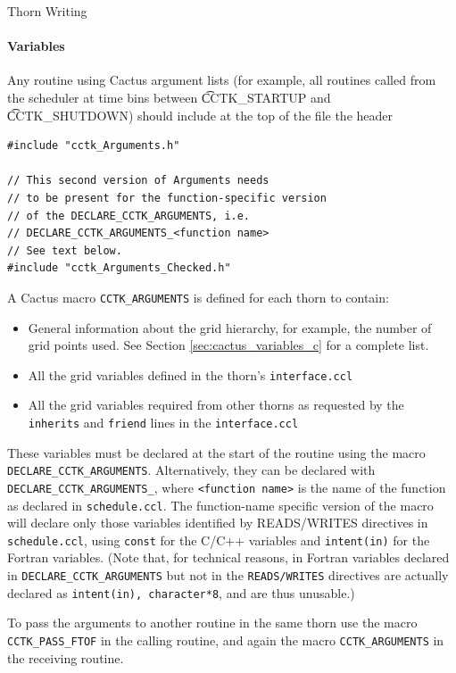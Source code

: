 \begin{cactuspart}{Thorn Writing}
\paragraph{Variables}

Any routine using Cactus argument lists (for example, all routines called from
the scheduler at time bins between {\t CCTK\_STARTUP} and {\t CCTK\_SHUTDOWN})
should include at the top of the file the header
\begin{verbatim}
#include "cctk_Arguments.h"

// This second version of Arguments needs
// to be present for the function-specific version
// of the DECLARE_CCTK_ARGUMENTS, i.e.
// DECLARE_CCTK_ARGUMENTS_<function name>
// See text below.
#include "cctk_Arguments_Checked.h"
\end{verbatim}

A Cactus macro \texttt{CCTK\_ARGUMENTS} is defined for each thorn
to contain:
\begin{itemize}
\item General information about the grid hierarchy, for example, the number
      of grid points used. See Section \ref{sec:cactus_variables_c} for a
      complete list.
\item All the grid variables defined in the thorn's \texttt{interface.ccl}
\item All the grid variables required from other thorns as requested by
      the \texttt{inherits} and \texttt{friend} lines in the \texttt{interface.ccl}
\end{itemize}
These variables must be declared at the start of the routine using
the macro \texttt{DECLARE\_CCTK\_ARGUMENTS}. Alternatively, they can
be declared with \texttt{DECLARE\_CCTK\_ARGUMENTS\_<function name>},
where \texttt{<function name>} is the name of the function as declared
in \texttt{schedule.ccl}. The function-name specific version of the macro
will declare only those variables identified by READS/WRITES directives
in \texttt{schedule.ccl}, using \texttt{const} for the C/C++ variables
and \texttt{intent(in)} for the Fortran variables. (Note that, for technical
reasons, in Fortran variables declared in \texttt{DECLARE\_CCTK\_ARGUMENTS}
but not in the \texttt{READS/WRITES} directives are actually declared as
\texttt{intent(in), character*8}, and are thus unusable.)

To pass the arguments to another routine in the same thorn use the macro
\texttt{CCTK\_PASS\_FTOF} in the calling routine, and again the macro
\texttt{CCTK\_ARGUMENTS} in the receiving routine.


\end{cactuspart}
